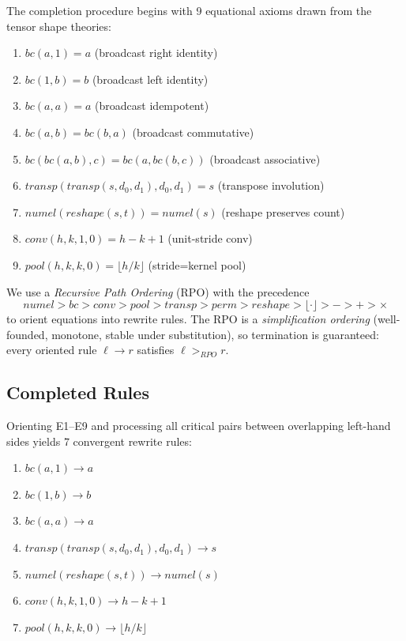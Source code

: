 \documentclass[11pt]{article}
\begin{document}
The completion procedure begins with 9 equational axioms drawn from
the tensor shape theories:
\begin{enumerate}[nosep,leftmargin=2em,label=\textbf{E\arabic*}]
  \item $\mathit{bc}(a, 1) = a$ \hfill (broadcast right identity)
  \item $\mathit{bc}(1, b) = b$ \hfill (broadcast left identity)
  \item $\mathit{bc}(a, a) = a$ \hfill (broadcast idempotent)
  \item $\mathit{bc}(a, b) = \mathit{bc}(b, a)$ \hfill (broadcast commutative)
  \item $\mathit{bc}(\mathit{bc}(a, b), c) = \mathit{bc}(a, \mathit{bc}(b, c))$ \hfill (broadcast associative)
  \item $\mathit{transp}(\mathit{transp}(s, d_0, d_1), d_0, d_1) = s$ \hfill (transpose involution)
  \item $\mathit{numel}(\mathit{reshape}(s, t)) = \mathit{numel}(s)$ \hfill (reshape preserves count)
  \item $\mathit{conv}(h, k, 1, 0) = h - k + 1$ \hfill (unit-stride conv)
  \item $\mathit{pool}(h, k, k, 0) = \lfloor h/k \rfloor$ \hfill (stride=kernel pool)
\end{enumerate}

\noindent
We use a \emph{Recursive Path Ordering} (RPO) with the precedence
\[
\mathit{numel} > \mathit{bc} > \mathit{conv} > \mathit{pool} >
\mathit{transp} > \mathit{perm} > \mathit{reshape} >
\lfloor\cdot\rfloor > {-} > {+} > {\times}
\]
to orient equations into rewrite rules. The RPO is a
\emph{simplification ordering} (well-founded, monotone, stable
under substitution), so termination is guaranteed: every oriented
rule $\ell \to r$ satisfies $\ell >_{\mathit{RPO}} r$.

\subsection{Completed Rules}

Orienting E1--E9 and processing all critical pairs between
overlapping left-hand sides yields 7 convergent rewrite rules:
\begin{enumerate}[nosep,leftmargin=2em,label=\textbf{R\arabic*}]
  \item $\mathit{bc}(a, 1) \to a$
  \item $\mathit{bc}(1, b) \to b$
  \item $\mathit{bc}(a, a) \to a$
  \item $\mathit{transp}(\mathit{transp}(s, d_0, d_1), d_0, d_1) \to s$
  \item $\mathit{numel}(\mathit{reshape}(s, t)) \to \mathit{numel}(s)$
  \item $\mathit{conv}(h, k, 1, 0) \to h - k + 1$
  \item $\mathit{pool}(h, k, k, 0) \to \lfloor h/k \rfloor$
\end{enumerate}
\end{document}
